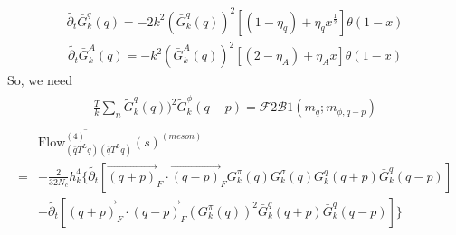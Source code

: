 \documentclass[12pt]{article}
\begin{document}
\begin{eqnarray}
\tilde{\partial_t}  \bar G^q_k (q) = -2k^2 (\bar G^q_k(q))^2 [(1-\eta_q)+\eta_q x^{\frac{1}{2}}]\theta(1-x)
\end{eqnarray}
\begin{eqnarray}
\tilde{\partial_t}  \bar G^{A}_k (q) = -k^2 (\bar G^{A}_k(q))^2 [(2-\eta_A)+\eta_A x]\theta(1-x)
\end{eqnarray}
So, we need
\begin{eqnarray}
\begin{split}
\frac{T}{k} \sum_n \tilde G^q_k(q))^2 \tilde G^{\phi}_k(q-p)  =\mathcal{F}2\mathcal{B}1(m_q;m_{\phi,q-p})
\end{split}
\end{eqnarray}
\begin{eqnarray}
\begin{split}
&\overline{ \text{Flow}_{(\bar q T^L q) (\bar q T^L q)}^{(4)}}(s)^{(meson)}\\
=&- \frac{2}{32N_c} h_k^4\big \{\tilde{\partial_t}[\overrightarrow{(q+p)}_F \cdot \overrightarrow{(q-p)}_F G^{\pi}_k (q) G^{\sigma}_k(q) G_k^q(q+p) \bar G_k^q (q-p)]\\
&-\tilde{\partial_t}[\overrightarrow{(q+p)}_F \cdot \overrightarrow{(q-p)}_F (G^{\pi}_k (q))^2\bar G_k^q(q+p) \bar G_k^q (q-p)] \big \}
\end{split}
\end{eqnarray}
\end{document}

